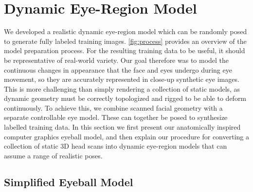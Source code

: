 


\section{Dynamic Eye-Region Model}

We developed a realistic dynamic eye-region model which can be randomly posed to generate fully labeled training images.
\autoref{fig:process} provides an overview of the model preparation process.
For the resulting training data to be useful, it should be representative of real-world variety.
Our goal therefore was to model the continuous changes in appearance that the face and eyes undergo during eye movement, so they are accurately represented in close-up synthetic eye images.
This is more challenging than simply rendering a collection of static models, as dynamic geometry must be correctly topologized and rigged to be able to deform continuously.
To achieve this, we combine scanned facial geometry with a separate controllable eye model. These can together be posed to synthesize labelled training data.
%
In this section we first present our anatomically inspired computer graphics eyeball model, and then explain our procedure for converting a collection of static 3D head scans into dynamic eye-region models that can assume a range of realistic poses.


\subsection{Simplified Eyeball Model}
\label{subsec:eyeball_model}

